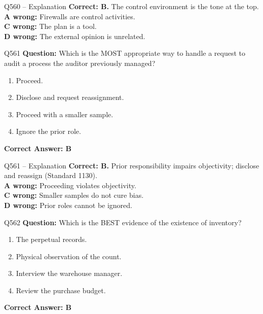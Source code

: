 \documentclass[aspectratio=169,10pt]{beamer}
\begin{document}
	\begin{frame}[t]{Q560 -- Explanation}
		\small
		\textbf{Correct: B.} The control environment is the tone at the top. \\[4pt]
		\textbf{A wrong:} Firewalls are control activities. \\[2pt]
		\textbf{C wrong:} The plan is a tool. \\[2pt]
		\textbf{D wrong:} The external opinion is unrelated.
	\end{frame}
	
	\begin{frame}[t]{Q561}
		\small
		\textbf{Question:} Which is the MOST appropriate way to handle a request to audit a process the auditor previously managed?
		\begin{enumerate}[label=\Alph*.,itemsep=1pt,topsep=2pt]
			\item Proceed.
			\item Disclose and request reassignment.
			\item Proceed with a smaller sample.
			\item Ignore the prior role.
		\end{enumerate}
		\vspace{4pt}
		\textbf{Correct Answer: B}
	\end{frame}
	
	\begin{frame}[t]{Q561 -- Explanation}
		\small
		\textbf{Correct: B.} Prior responsibility impairs objectivity; disclose and reassign (Standard 1130). \\[4pt]
		\textbf{A wrong:} Proceeding violates objectivity. \\[2pt]
		\textbf{C wrong:} Smaller samples do not cure bias. \\[2pt]
		\textbf{D wrong:} Prior roles cannot be ignored.
	\end{frame}
	
	\begin{frame}[t]{Q562}
		\small
		\textbf{Question:} Which is the BEST evidence of the existence of inventory?
		\begin{enumerate}[label=\Alph*.,itemsep=1pt,topsep=2pt]
			\item The perpetual records.
			\item Physical observation of the count.
			\item Interview the warehouse manager.
			\item Review the purchase budget.
		\end{enumerate}
		\vspace{4pt}
		\textbf{Correct Answer: B}
	\end{frame}
	
\end{document}
